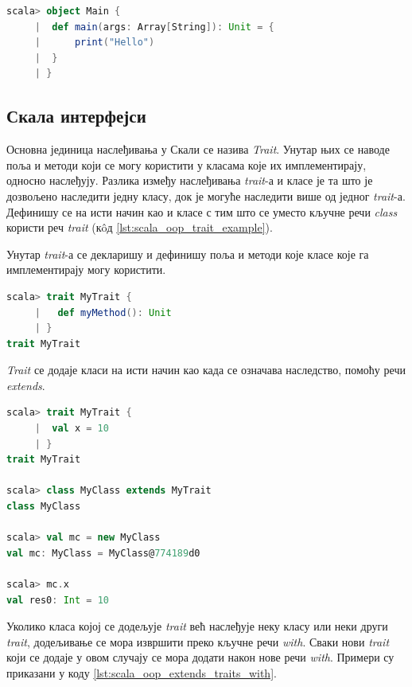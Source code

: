 \documentclass[12pt,oneside]{memoir}
\begin{document}
\begin{lstlisting}[language=Scala, caption={Пример main метода}, label={lst:scala_oop_main_method}]
scala> object Main {
     |  def main(args: Array[String]): Unit = {
     |      print("Hello")
     | 	}
     | }
\end{lstlisting}

\subsection{Скала интерфејси}
\label{subsec:scala_traits}

Основна јединица наслеђивања у Скали се назива \textit{Trait}. Унутар њих се наводе поља и методи који се могу користити у класама које их имплементирају, односно наслеђују. Разлика између наслеђивања \textit{trait}-а и класе је та што је дозвољено наследити једну класу, док је могуће наследити више од једног \textit{trait}-а. Дефинишу се на исти начин као и класе с тим што се уместо кључне речи \textit{class} користи реч \textit{trait} (к\^{o}д \ref{lst:scala_oop_trait_example}). \cite{scala_prog}

Унутар \textit{trait}-а се декларишу и дефинишу поља и методи које класе које га имплементирају могу користити.

\begin{lstlisting}[language=Scala, caption={Скала \textit{trait}}, label={lst:scala_oop_trait_example}]
scala> trait MyTrait {
     |   def myMethod(): Unit
     | }
trait MyTrait
\end{lstlisting}

\textit{Trait} се додаје класи на исти начин као када се означава наследство, помоћу речи \textit{extends}. 

\begin{lstlisting}[language=Scala, caption={Додавање \textit{trait}-а класи}, label={lst:scala_oop_traits_extends_example}]
scala> trait MyTrait {
     |  val x = 10
     | }
trait MyTrait

scala> class MyClass extends MyTrait
class MyClass

scala> val mc = new MyClass
val mc: MyClass = MyClass@774189d0

scala> mc.x
val res0: Int = 10
\end{lstlisting}

Уколико класа којој се додељује \textit{trait} већ наслеђује неку класу или неки други \textit{trait}, додељивање се мора извршити преко кључне речи \textit{with}. Сваки нови \textit{trait} који се додаје у овом случају се мора додати након нове речи \textit{with}. Примери су приказани у коду \ref{lst:scala_oop_extends_traits_with}. \cite{scala_prog}
\end{document}
